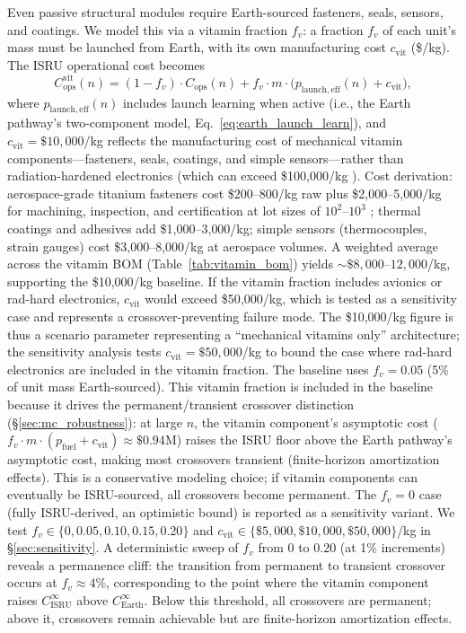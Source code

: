 \documentclass[preprint,12pt]{elsarticle}
\begin{document}
Even passive structural modules require Earth-sourced fasteners, seals, sensors, and coatings. We model this via a vitamin fraction $f_v$: a fraction $f_v$ of each unit's mass must be launched from Earth, with its own manufacturing cost $c_{\mathrm{vit}}$ (\$/kg). The ISRU operational cost becomes
\begin{equation}
  C_{\mathrm{ops}}^{\mathrm{vit}}(n) = (1 - f_v) \cdot C_{\mathrm{ops}}(n) + f_v \cdot m \cdot \bigl(p_{\mathrm{launch,eff}}(n) + c_{\mathrm{vit}}\bigr),
  \label{eq:vitamin}
\end{equation}
where $p_{\mathrm{launch,eff}}(n)$ includes launch learning when active (i.e., the Earth pathway's two-component model, Eq.~\ref{eq:earth_launch_learn}), and $c_{\mathrm{vit}} = \$10{,}000$/kg reflects the manufacturing cost of mechanical vitamin components---fasteners, seals, coatings, and simple sensors---rather than radiation-hardened electronics (which can exceed \$100{,}000/kg \cite{wertz2011}). Cost derivation: aerospace-grade titanium fasteners cost \$200--800/kg raw plus \$2{,}000--5{,}000/kg for machining, inspection, and certification at lot sizes of $10^2$--$10^3$ \cite{wertz2011}; thermal coatings and adhesives add \$1{,}000--3{,}000/kg; simple sensors (thermocouples, strain gauges) cost \$3{,}000--8{,}000/kg at aerospace volumes. A weighted average across the vitamin BOM (Table~\ref{tab:vitamin_bom}) yields ${\sim}\$8{,}000$--$12{,}000$/kg, supporting the \$10{,}000/kg baseline. If the vitamin fraction includes avionics or rad-hard electronics, $c_{\mathrm{vit}}$ would exceed \$50{,}000/kg, which is tested as a sensitivity case and represents a crossover-preventing failure mode. The \$10{,}000/kg figure is thus a scenario parameter representing a ``mechanical vitamins only'' architecture; the sensitivity analysis tests $c_{\mathrm{vit}} = \$50{,}000$/kg to bound the case where rad-hard electronics are included in the vitamin fraction. The baseline uses $f_v = 0.05$ (5\% of unit mass Earth-sourced). This vitamin fraction is included in the baseline because it drives the permanent/transient crossover distinction (\S\ref{sec:mc_robustness}): at large $n$, the vitamin component's asymptotic cost ($f_v \cdot m \cdot (p_{\mathrm{fuel}} + c_{\mathrm{vit}}) \approx \$0.94$M) raises the ISRU floor above the Earth pathway's asymptotic cost, making most crossovers transient (finite-horizon amortization effects). This is a conservative modeling choice; if vitamin components can eventually be ISRU-sourced, all crossovers become permanent. The $f_v = 0$ case (fully ISRU-derived, an optimistic bound) is reported as a sensitivity variant. We test $f_v \in \{0, 0.05, 0.10, 0.15, 0.20\}$ and $c_{\mathrm{vit}} \in \{\$5{,}000, \$10{,}000, \$50{,}000\}$/kg in \S\ref{sec:sensitivity}. A deterministic sweep of $f_v$ from 0 to 0.20 (at 1\% increments) reveals a permanence cliff: the transition from permanent to transient crossover occurs at $f_v \approx 4\%$, corresponding to the point where the vitamin component raises $C_{\mathrm{ISRU}}^{\infty}$ above $C_{\mathrm{Earth}}^{\infty}$. Below this threshold, all crossovers are permanent; above it, crossovers remain achievable but are finite-horizon amortization effects.
\end{document}

